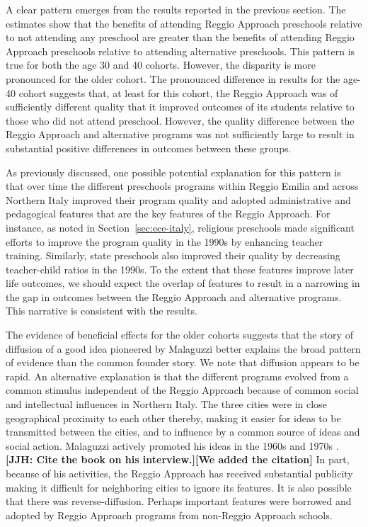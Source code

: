A clear pattern emerges from the results reported in the previous section. The estimates show that the benefits of attending Reggio Approach preschools relative to not attending any preschool are greater than the benefits of attending Reggio Approach preschools relative to attending alternative preschools. This pattern is true for both the age 30 and 40 cohorts. However, the disparity is more pronounced for the older cohort. The pronounced difference in results for the age-40 cohort suggests that, at least for this cohort, the Reggio Approach was of sufficiently different quality that it improved outcomes of its students relative to those who did not attend preschool. However, the quality difference between the Reggio Approach and alternative programs was not sufficiently large to result in substantial positive differences in outcomes between these groups.

As previously discussed, one possible potential explanation for this pattern is that over time the different preschools programs within Reggio Emilia and across Northern Italy improved their program quality and adopted administrative and pedagogical features that are the key features of the Reggio Approach. For instance, as noted in Section~\ref{sec:ece-italy}, religious preschools made significant efforts to improve the program quality in the 1990s by enhancing teacher training. Similarly, state preschools also improved their quality by decreasing teacher-child ratios in the 1990s. To the extent that these features improve later life outcomes, we should expect the overlap of features to result in a narrowing in the gap in outcomes between the Reggio Approach and alternative programs. This narrative is consistent with the results.

The evidence of beneficial effects for the older cohorts suggests that the story of diffusion of a good idea pioneered by Malaguzzi better explains the broad pattern of evidence than the common founder story. We note that diffusion appears to be rapid. An alternative explanation is that the different programs evolved from a common stimulus independent of the Reggio Approach because of common social and intellectual influences in Northern Italy. The three cities were in close geographical proximity to each other thereby, making it easier for ideas to be transmitted between the cities, and to influence by a common source of ideas and social action. Malaguzzi actively promoted his ideas in the 1960s and 1970s \citet{Cagliari-etal-eds_2016_BOOK_Loris-Malaguzzi}. \textbf{[JJH: Cite the book on his interview.][We added the citation]} In part, because of his activities, the Reggio Approach has received substantial publicity making it difficult for neighboring cities to ignore its features. It is also possible that there was reverse-diffusion. Perhaps important features were borrowed and adopted by Reggio Approach programs from non-Reggio Approach schools.

